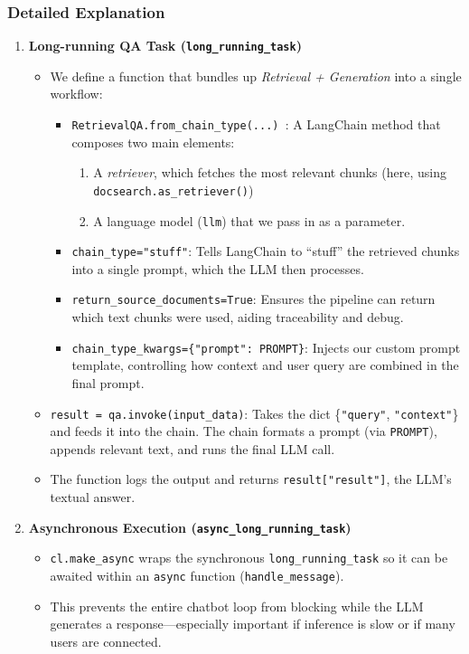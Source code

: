 \subsubsection*{Detailed Explanation}
\begin{enumerate}
    \item \textbf{Long-running QA Task (\texttt{long\_running\_task})}
    \begin{itemize}
        \item We define a function that bundles up \emph{Retrieval + Generation} into a single workflow:
        \begin{itemize}
            \item \texttt{RetrievalQA.from\_chain\_type(...) }: A LangChain method that composes two main elements:
                \begin{enumerate}
                    \item A \emph{retriever}, which fetches the most relevant chunks (here, using \texttt{docsearch.as\_retriever()})  
                    \item A language model (\texttt{llm}) that we pass in as a parameter.  
                \end{enumerate}
            \item \texttt{chain\_type="stuff"}: Tells LangChain to “stuff” the retrieved chunks into a single prompt, which the LLM then processes.
            \item \texttt{return\_source\_documents=True}: Ensures the pipeline can return which text chunks were used, aiding traceability and debug.
            \item \texttt{chain\_type\_kwargs=\{"prompt": PROMPT\}}: Injects our custom prompt template, controlling how context and user query are combined in the final prompt.
        \end{itemize}
        \item \texttt{result = qa.invoke(input\_data)}: Takes the dict \{\texttt{"query"}, \texttt{"context"}\} and feeds it into the chain. The chain formats a prompt (via \texttt{PROMPT}), appends relevant text, and runs the final LLM call.
        \item The function logs the output and returns \texttt{result["result"]}, the LLM’s textual answer.
    \end{itemize}

    \item \textbf{Asynchronous Execution (\texttt{async\_long\_running\_task})}
    \begin{itemize}
        \item \texttt{cl.make\_async} wraps the synchronous \texttt{long\_running\_task} so it can be awaited within an \texttt{async} function (\texttt{handle\_message}). 
        \item This prevents the entire chatbot loop from blocking while the LLM generates a response—especially important if inference is slow or if many users are connected.
    \end{itemize}


\end{enumerate}
